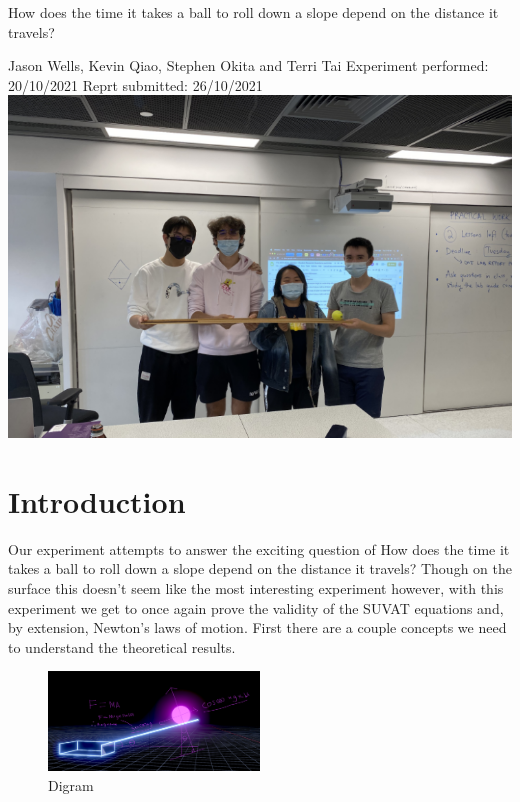 \documentclass[12pt]{report}
\begin{document}
\begin{center}
    {\Large How does the time it takes a ball to roll down a slope depend on the distance it travels?}

    \vspace{1cm}
    {\large Jason Wells, Kevin Qiao, Stephen Okita and Terri Tai}\newline
    {\large Experiment performed: 20/10/2021}\newline
    {\large Reprt submitted: 26/10/2021}
    \vspace{2cm}
    \includegraphics[width=\textwidth]{Img.png}

\end{center}
\tableofcontents
\section{Introduction}
Our experiment attempts to answer the exciting question of How does the time it takes a ball to roll down a slope depend on the distance it travels? Though on the surface this doesn't seem like the most interesting experiment however, with this experiment we get to once again prove the validity of the SUVAT equations and, by extension, Newton's laws of motion. First there are a couple concepts we need to understand the theoretical results.
\begin{figure}
    \centering
    \includegraphics[width=0.5\textwidth]{digram.png}
    \caption{Digram}
\end{figure}
\end{document}
